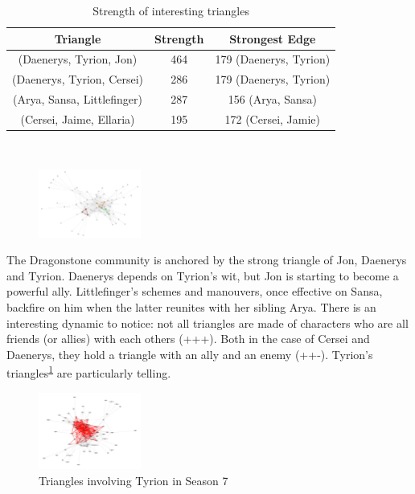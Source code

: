 \documentclass[10pt,twocolumn,letterpaper]{article}
\begin{document}
\begin{table}[h!]
    \centering
    \small
    \begin{tabular}{c|c|c}
        Triangle & Strength & Strongest Edge  \\
        \hline
        (Daenerys, Tyrion, Jon) & 464 & 179 (Daenerys, Tyrion) \\
        (Daenerys, Tyrion, Cersei) & 286 & 179 (Daenerys, Tyrion) \\
        (Arya, Sansa, Littlefinger) & 287 & 156 (Arya, Sansa) \\
        (Cersei, Jaime, Ellaria) & 195 & 172 (Cersei, Jamie) \\
        \hline 
    \end{tabular} \\
    \vspace{0.2cm}
    \caption{Strength of interesting triangles}
    \label{tab:my_label}
\end{table}

\begin{figure}[!h]
    \centering
    \includegraphics[width=0.3\textwidth]{img/s7/s7_triangles.jpg}
\end{figure}

The Dragonstone community is anchored by the strong triangle of Jon, Daenerys and Tyrion. Daenerys depends on Tyrion's wit, but Jon is starting to become a powerful ally. Littlefinger's schemes and manouvers, once effective on Sansa, backfire on him when the latter reunites with her sibling Arya. There is an interesting dynamic to notice: not all triangles are made of characters who are all friends (or allies) with each others (+++). Both in the case of Cersei and Daenerys, they hold a triangle with an ally and an enemy (++-). Tyrion's triangles\textsuperscript{\ref{fig:tyrion_triangles_s8}} are particularly telling.

\begin{figure}[!h]
    \centering
    \includegraphics[width=0.3\textwidth]{img/s7/tyrion_triangles.jpg}
    \caption{\small{Triangles involving Tyrion in Season 7}}
    \label{fig:tyrion_triangles_s8}
\end{figure}
\end{document}
